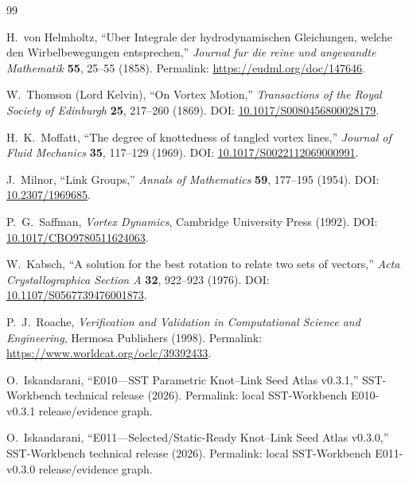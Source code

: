 \begin{thebibliography}{99}

H.~von Helmholtz,
``Uber Integrale der hydrodynamischen Gleichungen, welche den Wirbelbewegungen entsprechen,''
\emph{Journal fur die reine und angewandte Mathematik} \textbf{55}, 25--55 (1858).
Permalink: \url{https://eudml.org/doc/147646}.

W.~Thomson (Lord Kelvin),
``On Vortex Motion,''
\emph{Transactions of the Royal Society of Edinburgh} \textbf{25}, 217--260 (1869).
DOI: \href{https://doi.org/10.1017/S0080456800028179}{10.1017/S0080456800028179}.

H.~K.~Moffatt,
``The degree of knottedness of tangled vortex lines,''
\emph{Journal of Fluid Mechanics} \textbf{35}, 117--129 (1969).
DOI: \href{https://doi.org/10.1017/S0022112069000991}{10.1017/S0022112069000991}.

J.~Milnor,
``Link Groups,''
\emph{Annals of Mathematics} \textbf{59}, 177--195 (1954).
DOI: \href{https://doi.org/10.2307/1969685}{10.2307/1969685}.

P.~G.~Saffman,
\emph{Vortex Dynamics},
Cambridge University Press (1992).
DOI: \href{https://doi.org/10.1017/CBO9780511624063}{10.1017/CBO9780511624063}.

W.~Kabsch,
``A solution for the best rotation to relate two sets of vectors,''
\emph{Acta Crystallographica Section A} \textbf{32}, 922--923 (1976).
DOI: \href{https://doi.org/10.1107/S0567739476001873}{10.1107/S0567739476001873}.

P.~J.~Roache,
\emph{Verification and Validation in Computational Science and Engineering},
Hermosa Publishers (1998).
Permalink: \url{https://www.worldcat.org/oclc/39392433}.

O.~Iskandarani,
``E010---SST Parametric Knot--Link Seed Atlas v0.3.1,''
SST-Workbench technical release (2026).
Permalink: local SST-Workbench E010-v0.3.1 release/evidence graph.

O.~Iskandarani,
``E011---Selected/Static-Ready Knot--Link Seed Atlas v0.3.0,''
SST-Workbench technical release (2026).
Permalink: local SST-Workbench E011-v0.3.0 release/evidence graph.

\end{thebibliography}
